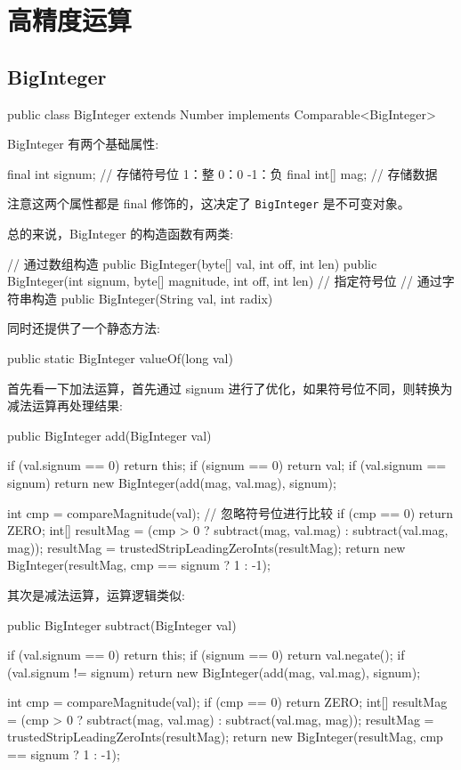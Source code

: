 \section{高精度运算}
\subsection{BigInteger}

\begin{Java}
public class BigInteger extends Number implements Comparable<BigInteger>
\end{Java}

BigInteger 有两个基础属性:

\begin{Java}
final int signum;     // 存储符号位 1：整  0：0 -1：负
final int[] mag;      // 存储数据
\end{Java}

注意这两个属性都是 final 修饰的，这决定了 \texttt{BigInteger} 是不可变对象。

总的来说，BigInteger 的构造函数有两类:
\begin{Java}
// 通过数组构造
public BigInteger(byte[] val, int off, int len)
public BigInteger(int signum, byte[] magnitude, int off, int len)   // 指定符号位
// 通过字符串构造
public BigInteger(String val, int radix)
\end{Java}

同时还提供了一个静态方法:
\begin{Java}
public static BigInteger valueOf(long val)
\end{Java}

首先看一下加法运算，首先通过 signum 进行了优化，如果符号位不同，则转换为减法运算再处理结果:
\begin{Java}
public BigInteger add(BigInteger val) {
    if (val.signum == 0)
        return this;
    if (signum == 0)
        return val;
    if (val.signum == signum)
        return new BigInteger(add(mag, val.mag), signum);

    int cmp = compareMagnitude(val);    // 忽略符号位进行比较
    if (cmp == 0)
        return ZERO;
    int[] resultMag = (cmp > 0 ? subtract(mag, val.mag)
                       : subtract(val.mag, mag));
    resultMag = trustedStripLeadingZeroInts(resultMag);
    return new BigInteger(resultMag, cmp == signum ? 1 : -1);
}
\end{Java}

其次是减法运算，运算逻辑类似:

\begin{Java}
public BigInteger subtract(BigInteger val) {
    if (val.signum == 0)
        return this;
    if (signum == 0)
        return val.negate();
    if (val.signum != signum)
        return new BigInteger(add(mag, val.mag), signum);

    int cmp = compareMagnitude(val);
    if (cmp == 0)
        return ZERO;
    int[] resultMag = (cmp > 0 ? subtract(mag, val.mag)
                       : subtract(val.mag, mag));
    resultMag = trustedStripLeadingZeroInts(resultMag);
    return new BigInteger(resultMag, cmp == signum ? 1 : -1);
}
\end{Java}


